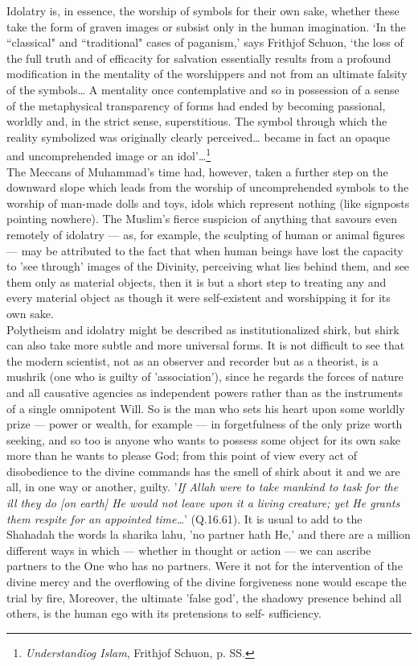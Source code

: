 \documentclass[10pt, twoside,openright]{book}
\begin{document}
Idolatry is, in essence, the worship of symbols for their own sake, whether these take the form of 
graven images or subsist only in the human imagination. `In the ``classical" and ``traditional" cases 
of paganism,' says Frithjof Schuon, `the loss of the full truth and of efficacity for salvation 
essentially results from a profound modification in the mentality of the worshippers and not from an 
ultimate falsity of the symbols\ldots{} A mentality once contemplative and so in possession of a sense of 
the metaphysical transparency of forms had ended by becoming passional, worldly and, in the strict 
sense, superstitious. The symbol through which the reality symbolized was originally clearly 
perceived\ldots{} became in fact an opaque and uncomprehended image or an idol'\ldots{}\footnote{\emph{Understandiog Islam}, Frithjof Schuon, p. SS.} \\

The Meccans of Muhammad's time had, however, taken a further step on the downward slope which leads 
from the worship of uncomprehended symbols to the worship of man\hyp{}made dolls and toys, idols which 
represent nothing (like signposts pointing nowhere). The Muslim's fierce suspicion of anything that 
savours even remotely of idolatry --- as, for example, the sculpting of human or animal figures --- may 
be attributed to the fact that when human beings have lost the capacity to 'see through' images of 
the Divinity, perceiving what lies behind them, and see them only as material objects, then it is but 
a short step to treating any and every material object as though it were self\hyp{}existent and 
worshipping it for its own sake. \\

Polytheism and idolatry might be described as institutionalized shirk, but shirk can also take more 
subtle and more universal forms. It is not difficult to see that the modern scientist, not as an 
observer and recorder but as a theorist, is a mushrik (one who is guilty of 'association'), since he 
regards the forces of nature and all causative agencies as independent powers rather than as the 
instruments of a single omnipotent Will. So is the man who sets his heart upon some worldly prize --- 
power or wealth, for example --- in forgetfulness of the only prize worth seeking, and so too is anyone 
who wants to possess some object for its own sake more than he wants to please God; from this point 
of view every act of disobedience to the divine commands has the smell of shirk about it and we are 
all, in one way or another, guilty. '\emph{If Allah were to take mankind to task for the ill they do [on 
earth] He would not leave upon it a living creature; yet He grants them respite for an appointed 
time\ldots{}}' (Q.16.61). It is usual to add to the Shahadah the words la sharika lahu, 'no partner hath 
He,' and there are a million different ways in which --- whether in thought or action --- we can ascribe 
partners to the One who has no partners. Were it not for the intervention of the divine mercy and the 
overflowing of the divine forgiveness none would escape the trial by fire, Moreover, the ultimate 
'false god', the shadowy presence behind all others, is the human ego with its pretensions to self\hyp{}
sufficiency. \\
\end{document}
